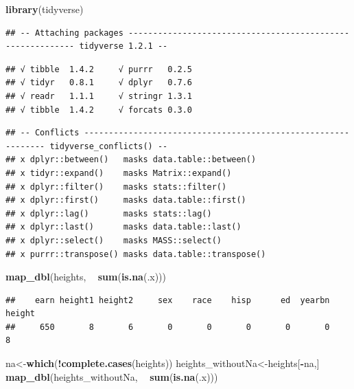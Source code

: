 \documentclass[]{article}
\newenvironment{Shaded}{\begin{snugshade}}{\end{snugshade}}
\newcommand{\KeywordTok}[1]{\textcolor[rgb]{0.13,0.29,0.53}{\textbf{#1}}}
\newcommand{\StringTok}[1]{\textcolor[rgb]{0.31,0.60,0.02}{#1}}
\newcommand{\OperatorTok}[1]{\textcolor[rgb]{0.81,0.36,0.00}{\textbf{#1}}}
\newcommand{\NormalTok}[1]{#1}
\begin{document}
\begin{Shaded}
\begin{Highlighting}[]
\KeywordTok{library}\NormalTok{(tidyverse)}
\end{Highlighting}
\end{Shaded}

\begin{verbatim}
## -- Attaching packages ----------------------------------------------------------- tidyverse 1.2.1 --
\end{verbatim}

\begin{verbatim}
## √ tibble  1.4.2     √ purrr   0.2.5
## √ tidyr   0.8.1     √ dplyr   0.7.6
## √ readr   1.1.1     √ stringr 1.3.1
## √ tibble  1.4.2     √ forcats 0.3.0
\end{verbatim}

\begin{verbatim}
## -- Conflicts -------------------------------------------------------------- tidyverse_conflicts() --
## x dplyr::between()   masks data.table::between()
## x tidyr::expand()    masks Matrix::expand()
## x dplyr::filter()    masks stats::filter()
## x dplyr::first()     masks data.table::first()
## x dplyr::lag()       masks stats::lag()
## x dplyr::last()      masks data.table::last()
## x dplyr::select()    masks MASS::select()
## x purrr::transpose() masks data.table::transpose()
\end{verbatim}

\begin{Shaded}
\begin{Highlighting}[]
\KeywordTok{map_dbl}\NormalTok{(heights, }\OperatorTok{~}\StringTok{ }\KeywordTok{sum}\NormalTok{(}\KeywordTok{is.na}\NormalTok{(.x)))}
\end{Highlighting}
\end{Shaded}

\begin{verbatim}
##    earn height1 height2     sex    race    hisp      ed  yearbn  height 
##     650       8       6       0       0       0       0       0       8
\end{verbatim}

\begin{Shaded}
\begin{Highlighting}[]
\NormalTok{na<-}\KeywordTok{which}\NormalTok{(}\OperatorTok{!}\KeywordTok{complete.cases}\NormalTok{(heights))}
\NormalTok{heights_withoutNa<-heights[}\OperatorTok{-}\NormalTok{na,]}
\KeywordTok{map_dbl}\NormalTok{(heights_withoutNa, }\OperatorTok{~}\StringTok{ }\KeywordTok{sum}\NormalTok{(}\KeywordTok{is.na}\NormalTok{(.x)))}
\end{Highlighting}
\end{Shaded}
\end{document}
